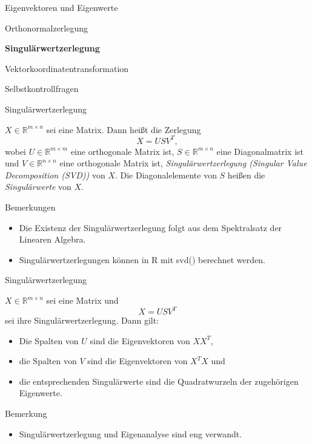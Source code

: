 \documentclass[
  8pt,
  ignorenonframetext,
]{beamer}
\providecommand{\tightlist}{%
  \setlength{\itemsep}{0pt}\setlength{\parskip}{0pt}}
\begin{document}
\begin{frame}{}
\protect\hypertarget{section-5}{}
\vfill
{}
\Large

Eigenvektoren und Eigenwerte

Orthonormalzerlegung

\textbf{Singulärwertzerlegung}

Vektorkoordinatentransformation

Selbstkontrollfragen \vfill 
\end{frame}

\begin{frame}{Singulärwertzerlegung}
\protect\hypertarget{singuluxe4rwertzerlegung}{}
\small
\begin{definition}[Singulärwertzerlegung]
\justifying
$X \in \mathbb{R}^{m \times n}$ sei eine Matrix. Dann heißt die Zerlegung
\begin{equation}
X = USV^T,
\end{equation}
wobei $U \in \mathbb{R}^{m \times m}$ eine orthogonale Matrix ist, $S \in \mathbb{R}^{m \times n}$
eine Diagonalmatrix ist und $V \in \mathbb{R}^{n \times n}$ eine orthogonale Matrix ist,
\textit{Singulärwertzerlegung (Singular Value Decomposition (SVD))} von $X$. Die
Diagonalelemente von  $S$ heißen die  \textit{Singulärwerte} von $X$.
\end{definition}

Bemerkungen

\begin{itemize}
\item Die Existenz der Singulärwertzerlegung folgt aus dem Spektralsatz der Linearen Algebra.
\item Singulärwertzerlegungen können in R mit  svd()  berechnet werden.
\end{itemize}
\end{frame}

\begin{frame}{Singulärwertzerlegung}
\protect\hypertarget{singuluxe4rwertzerlegung-1}{}
\small
\begin{theorem}
\justifying
\normalfont
$X \in \mathbb{R}^{m \times n}$ sei eine Matrix und
\begin{equation}
X = USV^T
\end{equation}
sei ihre Singulärwertzerlegung. Dann gilt:
\begin{itemize}
\item Die Spalten von $U$ sind die Eigenvektoren von $XX^T$,
\item die Spalten von $V$ sind die Eigenvektoren von $X^TX$ und
\item die entsprechenden Singulärwerte sind die Quadratwurzeln der zugehörigen Eigenwerte.
\end{itemize}
\end{theorem}

Bemerkung

\begin{itemize}
\tightlist
\item
  Singulärwertzerlegung und Eigenanalyse sind eng verwandt.
\end{itemize}
\end{frame}
\end{document}
